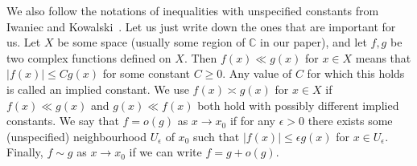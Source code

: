 \documentclass{amsart}
\numberwithin{equation}{section}
\theoremstyle{plain}
\theoremstyle{definition}
\theoremstyle{remark}
\begin{document}
We also follow the notations of inequalities with unspecified constants from Iwaniec and Kowalski~\cite[Introduction, p.7]{iwaniec2004analytic}.
Let us just write down the ones that are important for us.
Let $X$ be some space (usually some region of $\mathbb{C}$ in our paper), and let $f,g$ be two complex functions defined on $X$.
Then $f(x)\ll g(x)$ for $x\in X$ means that $\lvert f(x)\rvert\leq Cg(x)$ for some constant $C\geq0$.
Any value of $C$ for which this holds is called an implied constant.
We use $f(x)\asymp g(x)$ for $x\in X$ if $f(x)\ll g(x)$ and $g(x)\ll f(x)$ both hold with possibly different implied constants.
We say that $f=o(g)$ as $x\to x_0$ if for any $\epsilon>0$ there exists some (unspecified) neighbourhood $U_\epsilon$ of $x_0$ such that $\lvert f(x)\rvert\leq\epsilon g(x)$ for $x\in U_\epsilon$.
Finally, $f\sim g$ as $x\to x_0$ if we can write $f=g+o(g)$.
\end{document}
